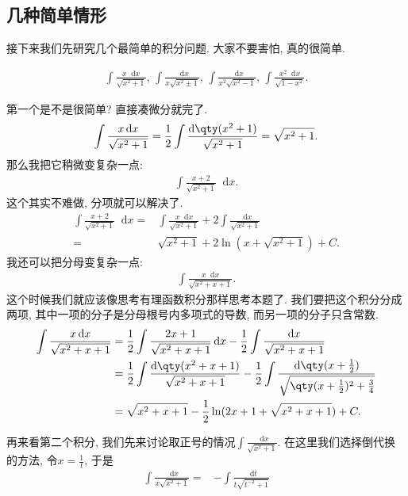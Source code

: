 \documentclass{ctexbook}
\newcommand*{\dif}{\mathop{}\!\mathrm{d}}
\begin{document}
{\subsection{几种简单情形}
接下来我们先研究几个最简单的积分问题. 大家不要害怕, 真的很简单. \par
\begin{align*}
\int\frac{x\dif{x}}{\sqrt{x^{2}+1}},\,\int\frac{\dif{x}}{x\sqrt{x^{2}\pm1}},\,\int\frac{\dif{x}}{x^{2}\sqrt{x^{2}-1}},\,\int\frac{x^{2}\dif{x}}{\sqrt{1-x^{2}}}
.\end{align*}\par
第一个是不是很简单? 直接凑微分就完了. 
\begin{align*}
\int\frac{x\dif{x}}{\sqrt{x^{2}+1}}=\frac{1}{2}\int\frac{\dif{\qty(x^{2}+1)}}{\sqrt{x^{2}+1}}=\sqrt{x^{2}+1}
.\end{align*}
那么我把它稍微变复杂一点: 
\begin{align*}
\int\frac{x+2}{\sqrt{x^{2}+1}}\dif{x}
.\end{align*}
这个其实不难做, 分项就可以解决了. 
\begin{align*}
\int\frac{x+2}{\sqrt{x^{2}+1}}\dif{x}={}&\int\frac{x\dif{x}}{\sqrt{x^{2}+1}}+2\int\frac{\dif{x}}{\sqrt{x^{2}+1}}\\
={}&\sqrt{x^{2}+1}+2\ln(x+\sqrt{x^{2}+1})+C
.\end{align*}
我还可以把分母变复杂一点: 
\begin{align*}
\int\frac{x\dif{x}}{\sqrt{x^{2}+x+1}}
.\end{align*}
这个时候我们就应该像思考有理函数积分那样思考本题了. 我们要把这个积分分成两项, 其中一项的分子是分母根号内多项式的导数, 而另一项的分子只含常数. 
\begin{align*}
\int\frac{x\dif{x}}{\sqrt{x^{2}+x+1}}={}&\frac{1}{2}\int\frac{2x+1}{\sqrt{x^{2}+x+1}}\dif{x}-\frac{1}{2}\int\frac{\dif{x}}{\sqrt{x^{2}+x+1}}\\
={}&\frac{1}{2}\int\frac{\dif{\qty(x^{2}+x+1)}}{\sqrt{x^{2}+x+1}}-\frac{1}{2}\int\frac{\dif{\qty(x+\frac{1}{2})}}{\sqrt{\qty(x+\frac{1}{2})^{2}+\frac{3}{4}}}\\
={}&\sqrt{x^{2}+x+1}-\frac{1}{2}\ln(2x+1+\sqrt{x^{2}+x+1})+C
.\end{align*}\par
再来看第二个积分, 我们先来讨论取正号的情况$\int\frac{\dif{x}}{\sqrt{x^{2}+1}}$. 在这里我们选择倒代换的方法, 令$x=\frac{1}{t}$, 于是
\begin{align*}
\int\frac{\dif{x}}{x\sqrt{x^{2}+1}}={}&-\int\frac{\dif{t}}{t\sqrt{t^{-2}+1}}\\

\end{align*}}
\end{document}
